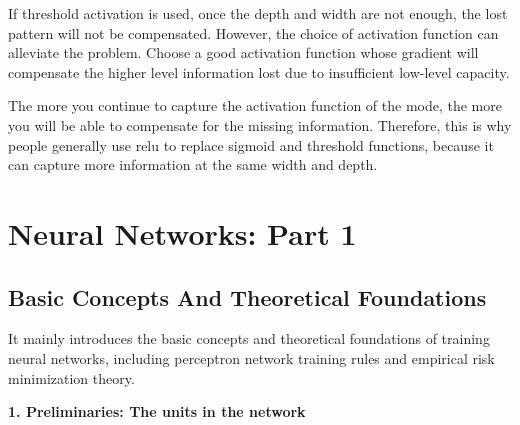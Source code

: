 \documentclass{article}
\begin{document}
	If threshold activation is used, once the depth and width are not enough, the lost pattern will not be compensated. However, the choice of activation function can alleviate the problem. Choose a good activation function whose gradient will compensate the higher level information lost due to insufficient low-level capacity.
	
	The more you continue to capture the activation function of the mode, the more you will be able to compensate for the missing information. Therefore, this is why people generally use relu to replace sigmoid and threshold functions, because it can capture more information at the same width and depth.
	
	
	
	
	\section{Neural Networks: Part 1}
	
	\subsection{Basic Concepts And Theoretical Foundations}
	
	It mainly introduces the basic concepts and theoretical foundations of training neural networks, including perceptron network training rules and empirical risk minimization theory.
	
	\textbf{1. Preliminaries: The units in the network}
	
\end{document}
